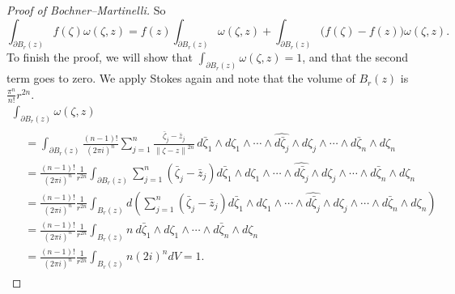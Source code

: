 \documentclass[12pt,openany]{book}
\newcommand{\norm}[1]{\left\lVert {#1} \right\rVert}
\theoremstyle{plain}
\theoremstyle{remark}
\theoremstyle{definition}
\theoremstyle{exercise}
\theoremstyle{example}
\begin{document}
\begin{proof}[Proof of Bochner--Martinelli]
So
\begin{equation*}
\int_{\partial B_r(z)}
f(\zeta) \omega(\zeta,z)
=
f(z)
\int_{\partial B_r(z)}
\omega(\zeta,z)
+
\int_{\partial B_r(z)}
\bigl(f(\zeta)-f(z)\bigr) \omega(\zeta,z) .
\end{equation*}
To finish the proof,
we will show that
$\int_{\partial B_r(z)}
\omega(\zeta,z) = 1$, and that the second term goes to zero.
We apply Stokes again
and note that the volume of $B_r(z)$ is
$\frac{\pi^n}{n!}r^{2n}$.
\begin{multline*}
\int_{\partial B_r(z)}
\omega(\zeta,z)
\\
\begin{aligned}
&=
\int_{\partial B_r(z)}
\frac{(n-1)!}{{(2\pi i)}^n}
\sum_{j=1}^n
\frac{\bar{\zeta}_j-\bar{z}_j}{\norm{\zeta-z}^{2n}} \,
d\bar{\zeta}_1 \wedge d\zeta_1 \wedge
\cdots \wedge
\widehat{ d\bar{\zeta}_j } \wedge d\zeta_j \wedge
\cdots \wedge
d\bar{\zeta}_n \wedge d\zeta_n
\\
&=
\frac{(n-1)!}{{(2\pi i)}^n}\frac{1}{r^{2n}}
\int_{\partial B_r(z)}
\sum_{j=1}^n(\bar{\zeta}_j-\bar{z}_j)
d\bar{\zeta}_1 \wedge d\zeta_1 \wedge
\cdots \wedge
\widehat{ d\bar{\zeta}_j } \wedge d\zeta_j \wedge
\cdots \wedge
d\bar{\zeta}_n \wedge d\zeta_n
\\
&=
\frac{(n-1)!}{{(2\pi i)}^n}\frac{1}{r^{2n}}
\int_{B_r(z)}
\!
d\left(
\sum_{j=1}^n(\bar{\zeta}_j-\bar{z}_j)
d\bar{\zeta}_1 \wedge d\zeta_1 \wedge
\cdots \wedge
\widehat{ d\bar{\zeta}_j } \wedge d\zeta_j \wedge
\cdots \wedge
d\bar{\zeta}_n \wedge d\zeta_n
\right)
\\
&=
\frac{(n-1)!}{{(2\pi i)}^n}\frac{1}{r^{2n}}
\int_{B_r(z)}
n~
d\bar{\zeta}_1 \wedge d\zeta_1 \wedge
\cdots \wedge
d\bar{\zeta}_n \wedge d\zeta_n
\\
&=
\frac{(n-1)!}{{(2\pi i)}^n}\frac{1}{r^{2n}}
\int_{B_r(z)}
n
{(2i)}^n dV
=
1 .
\end{aligned}
\end{multline*}


\end{proof}
\end{document}
